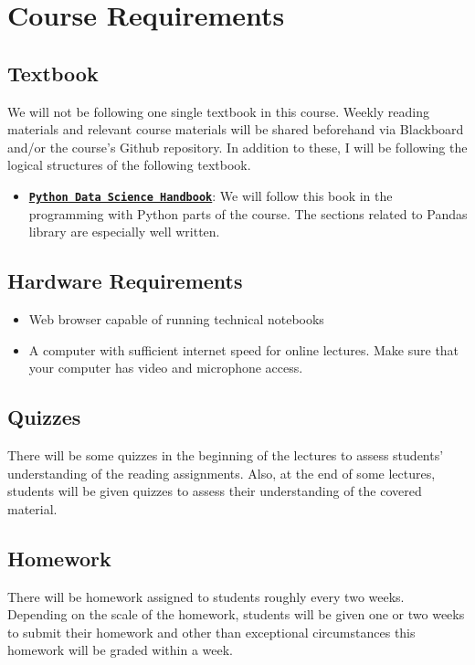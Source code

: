 \documentclass[11pt]{article}
\begin{document}
\section*{Course Requirements}
\subsection*{Textbook}
We will not be following one single textbook in this course. Weekly reading materials and relevant course materials will be shared beforehand via Blackboard and/or the course's Github repository. In addition to these, I will be following the logical structures of the following textbook.
\begin{itemize}
\item \href{https://jakevdp.github.io/PythonDataScienceHandbook/}{\tt\bf Python Data Science Handbook}: We will follow this book in the programming with Python parts of the course. The sections related to Pandas library are especially well written.
\end{itemize}
\subsection*{Hardware Requirements}
\begin{itemize}
	\item Web browser capable of running technical notebooks
	\item A computer with sufficient internet speed for online lectures. Make sure that your computer has video and microphone access.
\end{itemize}

\subsection*{Quizzes}

There will be some quizzes in the beginning of the lectures to assess students' understanding of the reading assignments. Also, at the end of some lectures, students will be given quizzes to assess their understanding of the covered material.
\subsection*{Homework}

There will be homework assigned to students roughly every two weeks. Depending on the scale of the homework, students will be given one or two weeks to submit their homework and other than exceptional circumstances this homework will be graded within a week.
\end{document}
